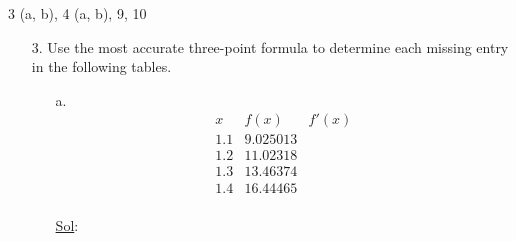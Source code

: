 3 (a, b), 4 (a, b), 9, 10

\begin{enumerate}
  \item[3.] Use the most accurate three-point formula to determine
    each missing entry in the following tables.
    \begin{enumerate}
      \item[a.] \[
          \begin{array}{c|c|c}
            x & f(x) & f'(x) \\
            \hline
            1.1 & 9.025013 & \\
            1.2 & 11.02318 & \\
            1.3 & 13.46374 & \\
            1.4 & 16.44465 & \\
          \end{array}
        \]

        \underline{Sol}:\\


\end{enumerate}
\end{enumerate}
